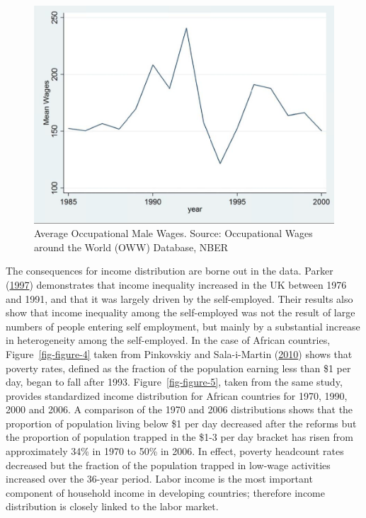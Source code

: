 \documentclass[
  a4paper,
  DIV=11,
  numbers=noendperiod]{scrartcl}
\begin{document}
\begin{figure}

{\centering \includegraphics{figures/figure-3.png}

}

\caption{\label{fig-figure-3}Average Occupational Male Wages. Source:
Occupational Wages around the World (OWW) Database, NBER}

\end{figure}

The consequences for income distribution are borne out in the data.
Parker (\protect\hyperlink{ref-parker1997}{1997}) demonstrates that
income inequality increased in the UK between 1976 and 1991, and that it
was largely driven by the self-employed. Their results also show that
income inequality among the self-employed was not the result of large
numbers of people entering self employment, but mainly by a substantial
increase in heterogeneity among the self-employed. In the case of
African countries, Figure~\ref{fig-figure-4} taken from Pinkovskiy and
Sala-i-Martin (\protect\hyperlink{ref-pinkovskiy2010}{2010}) shows that
poverty rates, defined as the fraction of the population earning less
than \$1 per day, began to fall after 1993. Figure~\ref{fig-figure-5},
taken from the same study, provides standardized income distribution for
African countries for 1970, 1990, 2000 and 2006. A comparison of the
1970 and 2006 distributions shows that the proportion of population
living below \$1 per day decreased after the reforms but the proportion
of population trapped in the \$1-3 per day bracket has risen from
approximately 34\% in 1970 to 50\% in 2006. In effect, poverty headcount
rates decreased but the fraction of the population trapped in low-wage
activities increased over the 36-year period. Labor income is the most
important component of household income in developing countries;
therefore income distribution is closely linked to the labor market.
\end{document}
